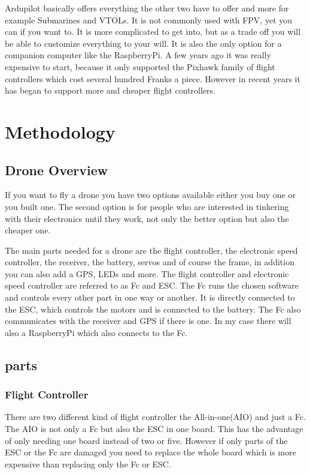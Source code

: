\documentclass{article}
\begin{document}
	Ardupilot basically offers everything the other two have to offer and more for example Submarines and VTOLs. It is not commonly used with FPV, yet you can if you want to. It is more complicated to get into, but as a trade off you will be able to customize everything to your will. It is also the only option for a companion computer like the RaspberryPi. A few years ago it was really expensive to start, because it only supported the Pixhawk family of flight controllers which cost several hundred Franks a piece. However in recent years it has began to support more and cheaper flight controllers.
	
	\section{Methodology}
	\subsection{Drone Overview}
	If you want to fly a drone you have two options available either you buy one or you built one. The second option is for people who are interested in tinkering with their electronics until they work, not only the better option but also the cheaper one.
	
	The main parts needed for a drone are the flight controller, the electronic speed controller, the receiver, the battery, servos and of course the frame, in addition you can also add a GPS, LEDs and more. The flight controller and electronic speed controller are referred to as Fc and ESC. The Fc runs the chosen software and controls every other part in one way or another. It is directly connected to the ESC, which controls the motors and is connected to the battery. The Fc also communicates with the receiver and GPS if there is one. In my case there will also a RaspberryPi which also connects to the Fc.
	  
	\subsection{parts}
	
	\subsubsection[Fc]{Flight Controller}
	There are two different kind of flight controller the All-in-one(AIO) and just a Fc. The AIO is not only a Fc but also the ESC in one board. This has the advantage of only needing one board instead of two or five. However if only parts of the ESC or the Fc are damaged you need to replace the whole board which is more expensive than replacing only the Fc or ESC. 
	
\end{document}

